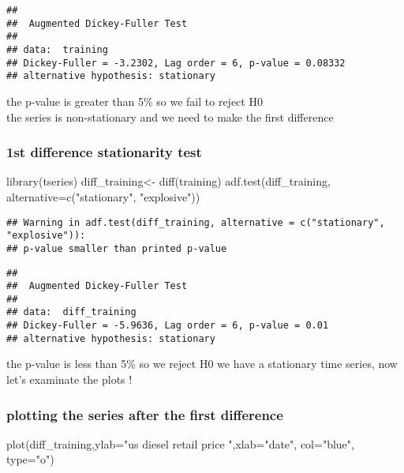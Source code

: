 \documentclass[
]{article}
\newenvironment{Shaded}{\begin{snugshade}}{\end{snugshade}}
\newcommand{\AttributeTok}[1]{\textcolor[rgb]{0.77,0.63,0.00}{#1}}
\newcommand{\FunctionTok}[1]{\textcolor[rgb]{0.00,0.00,0.00}{#1}}
\newcommand{\NormalTok}[1]{#1}
\newcommand{\OtherTok}[1]{\textcolor[rgb]{0.56,0.35,0.01}{#1}}
\newcommand{\StringTok}[1]{\textcolor[rgb]{0.31,0.60,0.02}{#1}}
\begin{document}
\begin{verbatim}
## 
##  Augmented Dickey-Fuller Test
## 
## data:  training
## Dickey-Fuller = -3.2302, Lag order = 6, p-value = 0.08332
## alternative hypothesis: stationary
\end{verbatim}

the p-value is greater than 5\% so we fail to reject H0\\
the series is non-stationary and we need to make the first difference

\hypertarget{st-difference-stationarity-test}{%
\subsubsection{1st difference stationarity
test}\label{st-difference-stationarity-test}}

\begin{Shaded}
\begin{Highlighting}[]
\FunctionTok{library}\NormalTok{(tseries)}
\NormalTok{diff\_training}\OtherTok{\textless{}{-}} \FunctionTok{diff}\NormalTok{(training)}
\FunctionTok{adf.test}\NormalTok{(diff\_training, }\AttributeTok{alternative=}\FunctionTok{c}\NormalTok{(}\StringTok{"stationary"}\NormalTok{, }\StringTok{"explosive"}\NormalTok{))}
\end{Highlighting}
\end{Shaded}

\begin{verbatim}
## Warning in adf.test(diff_training, alternative = c("stationary", "explosive")):
## p-value smaller than printed p-value
\end{verbatim}

\begin{verbatim}
## 
##  Augmented Dickey-Fuller Test
## 
## data:  diff_training
## Dickey-Fuller = -5.9636, Lag order = 6, p-value = 0.01
## alternative hypothesis: stationary
\end{verbatim}

the p-value is less than 5\% so we reject H0 we have a stationary time
series, now let's examinate the plots !

\hypertarget{plotting-the-series-after-the-first-difference}{%
\subsubsection{plotting the series after the first
difference}\label{plotting-the-series-after-the-first-difference}}

\begin{Shaded}
\begin{Highlighting}[]
\FunctionTok{plot}\NormalTok{(diff\_training,}\AttributeTok{ylab=}\StringTok{"us diesel retail price "}\NormalTok{,}\AttributeTok{xlab=}\StringTok{"date"}\NormalTok{, }\AttributeTok{col=}\StringTok{"blue"}\NormalTok{, }\AttributeTok{type=}\StringTok{"o"}\NormalTok{)}
\end{Highlighting}
\end{Shaded}
\end{document}
